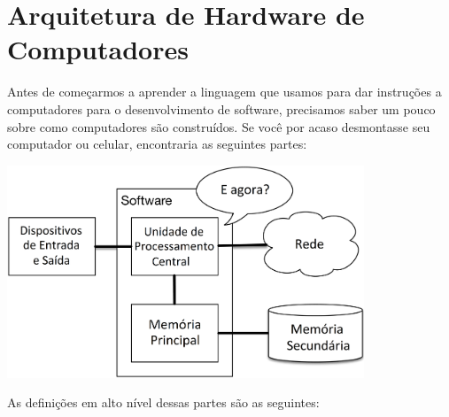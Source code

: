 \section{Arquitetura de Hardware de Computadores}%

Antes de começarmos a aprender a linguagem que usamos para dar instruções a computadores para o desenvolvimento de software, precisamos saber um pouco sobre como computadores são construídos. Se você por acaso desmontasse seu computador ou celular, encontraria as seguintes partes:


\centerline{\includegraphics[height=2.50in]{imagens/arch.png}}


As definições em alto nível dessas partes são as seguintes:

